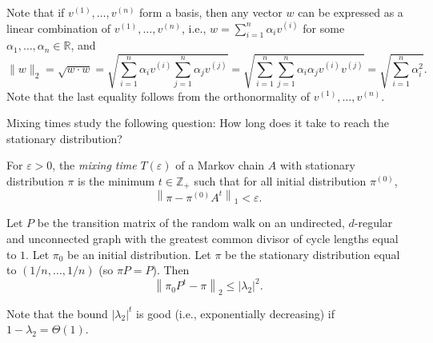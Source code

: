 \documentclass[letterpaper, reqno,11pt]{article}
\newcommand{\RR}{\mathbb{R}}
\newcommand{\ZZ}{\mathbb{Z}}
\begin{document}
Note that if $v^{(1)}, \ldots, v^{(n)}$ form a basis, then any vector $w$ can be expressed as a linear combination of $v^{(1)}, \ldots, v^{(n)}$, i.e., $w = \sum_{i = 1}^n \alpha_i v^{(i)}$ for some $\alpha_1, \ldots, \alpha_n \in \RR$, and
$$ \| w \|_2 = \sqrt{w \cdot w} = \sqrt{\sum_{i = 1}^n \alpha_i v^{(i)} \sum_{j = 1}^n \alpha_j v^{(j)}} = \sqrt{\sum_{i = 1}^n \sum_{j = 1}^n \alpha_i \alpha_j v^{(i)} v^{(j)}} = \sqrt{\sum_{i = 1}^n \alpha_i^2}. $$
Note that the last equality follows from the orthonormality of $v^{(1)}, \ldots, v^{(n)}$.

Mixing times study the following question: How long does it take to reach the stationary distribution?

\begin{definition}
  For $\varepsilon > 0$, the \emph{mixing time} $T(\varepsilon)$ of a Markov chain $A$ with stationary distribution $\pi$ is the minimum $t \in \ZZ_+$ such that for all initial distribution $\pi^{(0)}$,
  $$ \left\| \pi - \pi^{(0)} A^t \right\|_1 < \varepsilon. $$
\end{definition}

\begin{theorem} \label{thm:mixing}
  Let $P$ be the transition matrix of the random walk on an undirected, $d$-regular and unconnected graph with the greatest common divisor of cycle lengths equal to $1$. Let $\pi_0$ be an initial distribution. Let $\pi$ be the stationary distribution equal to $(1/n, \ldots, 1/n)$ (so $\pi P  = P$). Then
  $$ \left\| \pi_0 P^t - \pi \right\|_2 \leq \left|\lambda_2\right|^2. $$
\end{theorem}

Note that the bound $|\lambda_2|^t$ is good (i.e., exponentially decreasing) if $1 - \lambda_2 = \Theta(1)$.
\end{document}
